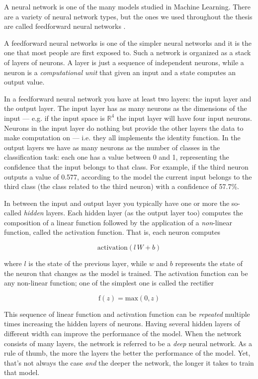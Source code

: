 A neural network is one of the many models studied in Machine Learning.
There are a variety of neural network types, but the ones we used
throughout the thesis are called feedforward neural
networks \cite{Goodfellow-et-al-2016}.

A feedforward neural networks is one of the simpler neural networks and
it is the one that most people are first exposed to. Such a network is
organized as a stack of layers of neurons. A layer is just a sequence
of independent neurons, while a neuron is a \emph{computational unit}
that given an input and a state computes an output value.

In a feedforward neural network you have at least two layers: the input
layer and the output layer. The input layer has as many neurons as the
dimensions of the input --- e.g. if the input space is $\mathbb{R}^4$
the input layer will have four input neurons. Neurons in the input
layer do nothing but provide the other layers the data to make
computation on --- i.e. they all implements the identity function.
In the output layers we have as many neurons as the number of
classes in the classification task: each one has a value between 0 and
1, representing the confidence that the input belongs to that class.
For example, if the third neuron outputs a value of 0.577, according to
the model the current input belongs to the third class (the class
related to the third neuron) with a confidence of 57.7\%.

In between the input and output layer you typically have one or more
the so-called \emph{hidden} layers. Each hidden layer (as the output
layer too) computes the composition of a linear function followed by
the application of a \emph{non}-linear function, called the activation
function. That is, each neuron computes

\[ \text{activation}(l \, W + b) \]

where $l$ is the state of the previous layer, while $w$ and $b$
represents the state of the neuron that changes as the model is
trained. The activation function can be any non-linear function; one of
the simplest one is called the rectifier

\[ \text{f}(z) = \text{max}(0, z) \]

This sequence of linear function and activation function can be
\emph{repeated} multiple times increasing the hidden layers of neurons.
Having several hidden layers of different width can improve the
performance of the model. When the network consists of many layers, the
network is referred to be a \emph{deep} neural network. As a rule of
thumb, the more the layers the better the performance of the model.
Yet, that's not always the case \emph{and} the deeper the network, the
longer it takes to train that model.

